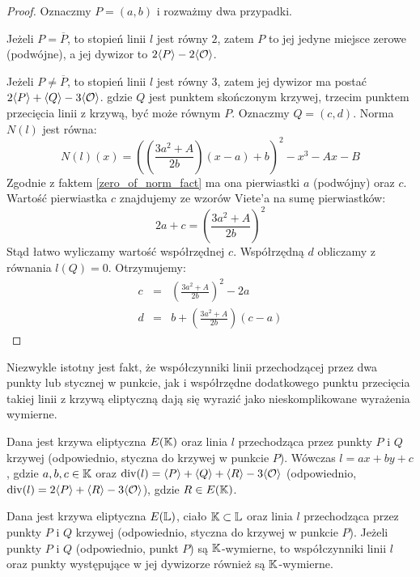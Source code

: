 \begin{proof}
Oznaczmy $P = (a, b)$
i rozważmy dwa przypadki.

Jeżeli $P = \overline{P}$,
to stopień linii $l$ jest równy $2$,
zatem $P$ to jej jedyne miejsce zerowe (podwójne),
a jej dywizor to $2\langle P\rangle - 2\langle\mathcal{O}\rangle$.

Jeżeli $P \neq \overline{P}$,
to stopień linii $l$ jest równy $3$,
zatem jej dywizor ma postać
$2\langle P\rangle+ \langle Q\rangle - 3\langle\mathcal{O}\rangle$.
gdzie $Q$ jest punktem skończonym krzywej,
trzecim punktem przecięcia linii z krzywą,
być może równym $P$.
Oznaczmy $Q = (c, d)$.
Norma $N(l)$ jest równa:
\begin{equation*}
N(l)(x) =
\left(\left(\frac{3a^2+A}{2b}\right)(x-a) + b\right)^2 - x^3 - Ax - B
\end{equation*}
Zgodnie z faktem \ref{zero_of_norm_fact}
ma ona pierwiastki $a$ (podwójny) oraz $c$.
Wartość pierwiastka $c$ znajdujemy ze wzorów Viete'a na sumę pierwiastków:
\begin{equation*}
2a + c = \left(\frac{3a^2+A}{2b}\right)^2
\end{equation*}
Stąd łatwo wyliczamy wartość współrzędnej $c$.
Współrzędną $d$ obliczamy z równania $l(Q) = 0$.
Otrzymujemy:
\begin{eqnarray}
\label{tangent_line_third_point_x_eqn}
c & = & \left(\frac{3a^2+A}{2b}\right)^2 - 2a \\
\label{tangent_line_third_point_y_eqn}
d & = & b + \left(\frac{3a^2+A}{2b}\right)(c-a)
\end{eqnarray}
\end{proof}

Niezwykle istotny jest fakt,
że współczynniki linii przechodzącej przez dwa punkty
lub stycznej w punkcie,
jak i współrzędne dodatkowego punktu przecięcia
takiej linii z krzywą eliptyczną dają się wyrazić
jako nieskomplikowane wyrażenia wymierne.

\begin{fact}
Dana jest krzywa eliptyczna $E(\mathbb{K})$
oraz linia $l$ przechodząca przez punkty $P$ i $Q$ krzywej
(odpowiednio, styczna do krzywej w punkcie $P$).
Wówczas $l = ax + by + c$, gdzie $a,b,c \in \mathbb{K}$
oraz $\operatorname{div}(l) = \langle P\rangle + \langle Q\rangle + \langle R\rangle - 3\langle\mathcal{O}\rangle$
(odpowiednio, $\operatorname{div}(l) = 2\langle P\rangle + \langle R\rangle - 3\langle\mathcal{O}\rangle$),
gdzie $R \in E(\mathbb{K})$.
\end{fact}

\begin{fact}
Dana jest krzywa eliptyczna $E(\mathbb{L})$, ciało $\mathbb{K} \subset \mathbb{L}$
oraz linia $l$ przechodząca przez punkty $P$ i $Q$ krzywej
(odpowiednio, styczna do krzywej w punkcie $P$).
Jeżeli punkty $P$ i $Q$ (odpowiednio, punkt $P$) są $\mathbb{K}$-wymierne,
to współczynniki linii $l$
oraz punkty występujące w jej dywizorze
również są $\mathbb{K}$-wymierne.
\end{fact}

